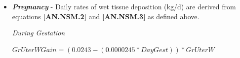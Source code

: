 \documentclass{article}
\begin{document}
\begin{refsection}
\begin{itemize}
            {\raggedleft \textbf{[AN.NSM.13]}\par}
            \vspace{0.2cm} 

\begin{center}
    \(ProtADG = (0.201 + 0.081 * (\frac{BW}{MW})) * \frac{EBG}{ADG}\) 
\end{center}
\vspace{0.5cm}

            {\raggedleft \textbf{[AN.NSM.14]}\par}
            \vspace{0.2cm} 
\begin{center}
    \(REFADG = 9.4 * FatADG + 5.55 * ProtADG\) 
\end{center}
\vspace{0.5cm}

            {\raggedleft \textbf{[AN.NSM.15]}\par}
            \vspace{0.2cm}

\begin{center}
    \(MEFrameADG = \frac{REFADG}{0.4}\) 
\end{center}
\vspace{0.5cm}

            {\raggedleft \textbf{[AN.NSM.16]}\par}
            \vspace{0.2cm}

\begin{center}
    \(NElFrameADG = \frac{REFADG}{0.61}\) 
\end{center}
\vspace{0.5cm}

            {\raggedleft \textbf{[AN.NSM.17]}\par}
            \vspace{0.2cm}
\vspace{0.5cm}



        \item \textbf{\textit{Pregnancy}} - Daily rates of wet tissue deposition (kg/d) are derived from equations \textbf{[AN.NSM.2]} and \textbf{[AN.NSM.3]} as defined above.
\vspace{0.2cm}

\textit{\small During Gestation}
\vspace{0.2cm}

\begin{center}
    \(GrUterWGain = (0.0243 - (0.0000245 * DayGest)) * GrUterW\)
\end{center}
\vspace{0.5cm}


\end{itemize}
\end{refsection}
\end{document}
